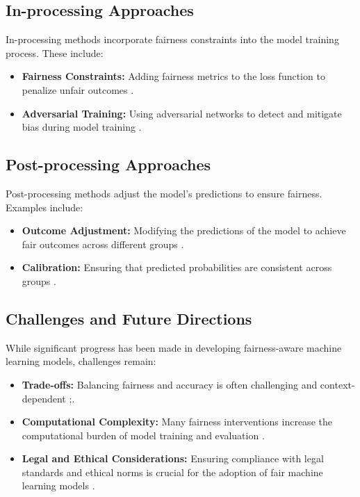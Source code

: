 \documentclass[12pt,a4paper]{report}
\begin{document}
\subsection{In-processing Approaches}
In-processing methods incorporate fairness constraints into the model training process. These include:
\begin{itemize}
    \item \textbf{Fairness Constraints:} Adding fairness metrics to the loss function to penalize unfair outcomes \citep{caton2024fairness}.
    \item \textbf{Adversarial Training:} Using adversarial networks to detect and mitigate bias during model training \citep{caton2024fairness}.
\end{itemize}

\subsection{Post-processing Approaches}
Post-processing methods adjust the model's predictions to ensure fairness. Examples include:
\begin{itemize}
    \item \textbf{Outcome Adjustment:} Modifying the predictions of the model to achieve fair outcomes across different groups \citep{hardt2016equality}.
    \item \textbf{Calibration:} Ensuring that predicted probabilities are consistent across groups \citep{caton2024fairness}.
\end{itemize}

\subsection{Challenges and Future Directions}
While significant progress has been made in developing fairness-aware machine learning models, challenges remain:
\begin{itemize}
    \item \textbf{Trade-offs:} Balancing fairness and accuracy is often challenging and context-dependent \citep{caton2024fairness};\citep{mehrabi2021survey}.
    \item \textbf{Computational Complexity:} Many fairness interventions increase the computational burden of model training and evaluation \citep{caton2024fairness}.
    \item \textbf{Legal and Ethical Considerations:} Ensuring compliance with legal standards and ethical norms is crucial for the adoption of fair machine learning models \citep{caton2024fairness}.
\end{itemize}
\end{document}
